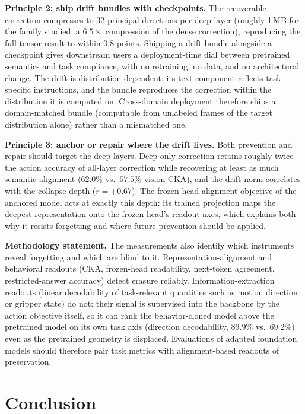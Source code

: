\documentclass{article}
\begin{document}
\textbf{Principle 2: ship drift bundles with checkpoints.} The recoverable correction
compresses to 32 principal directions per deep layer (roughly 1\,MB for the family
studied, a $6.5\times$ compression of the dense correction), reproducing the full-tensor
result to within $0.8$ points.
Shipping a drift bundle alongside a checkpoint gives downstream users a deployment-time dial
between pretrained semantics and task compliance, with no retraining, no data, and no
architectural change. The drift is distribution-dependent: its text component reflects
task-specific instructions, and the bundle reproduces the correction within the distribution
it is computed on. Cross-domain deployment therefore ships a domain-matched bundle
(computable from unlabeled frames of the target distribution alone) rather than a
mismatched one.

\textbf{Principle 3: anchor or repair where the drift lives.} Both prevention and repair
should target the deep layers. Deep-only correction retains roughly twice the action
accuracy of all-layer correction while recovering at least as much semantic alignment
($62.0\%$ vs.\ $57.5\%$ vision CKA), and the drift norm correlates
with the collapse depth ($r = +0.67$). The frozen-head alignment objective of the anchored
model acts at exactly this depth: its trained projection maps the deepest representation
onto the frozen head's readout axes, which explains both why it resists forgetting and
where
future prevention should be applied.

\textbf{Methodology statement.} The measurements also identify which instruments reveal
forgetting and which are blind to it. Representation-alignment and behavioral readouts
(CKA, frozen-head readability, next-token agreement, restricted-answer accuracy) detect
erasure reliably. Information-extraction readouts (linear decodability of task-relevant
quantities such as motion direction or gripper state) do not: their signal is supervised
into the backbone by the action objective itself, so it can rank the behavior-cloned model
above the pretrained model on its own task axis (direction decodability, $89.9\%$ vs.\
$69.2\%$) even as the pretrained geometry is displaced. Evaluations of adapted foundation
models should therefore pair task metrics with alignment-based readouts of preservation.

\section{Conclusion}
\label{sec:conclusion}
\end{document}
